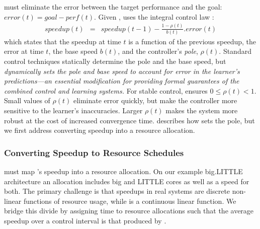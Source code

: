 \SYSTEM{} must eliminate the error between the target performance and the goal: $ error(t) = goal - perf(t)$.
Given , \SYSTEM{} uses the integral control law
\cite{Hellerstein2004a}:
\begin{eqnarray}
  speedup(t) &=& speedup(t-1) - \frac{1 - \rho(t)}{b(t)}.error(t)
  \label{eqn:speedup-control}
\end{eqnarray}
which states that the speedup at time $t$ is a function of the
previous speedup, the error at time $t$, the base speed $b(t)$, and
the controller's \emph{pole}, $\rho(t)$.  Standard control techniques
statically determine the pole and the base speed, but \SYSTEM{}
\emph{dynamically sets the pole and base speed to account for error in
  the learner's predictions---an essential modification for providing
  formal guarantees of the combined control and learning systems.}
For stable control, \SYSTEM{} ensures $0 \le \rho(t) < 1$. Small
values of $\rho(t)$ eliminate error quickly, but make the controller
more sensitive to the learner's inaccuracies.  Larger $\rho(t)$ makes
the system more robust at the cost of increased convergence time.
 describes how \SYSTEM{} sets the pole, but we
first address converting speedup into a resource allocation.

\subsubsection{Converting Speedup to Resource Schedules}
\SYSTEM{} must map 's speedup into a resource
allocation.  On our example big.LITTLE architecture an allocation
includes big and LITTLE cores as well as a speed for both.  The
primary challenge is that speedups in real systems are discrete
non-linear functions of resource usage, while 
is a continuous linear function.  We bridge this divide by assigning
time to resource allocations such that the average speedup over a
control interval is that produced by .

